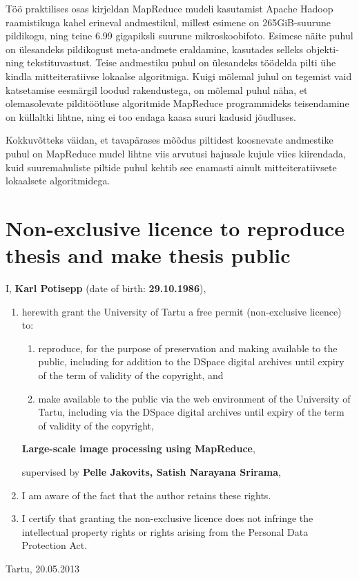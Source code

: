 \documentclass [12pt,a4paper]{report}
\begin{document}
Töö praktilises osas kirjeldan MapReduce mudeli kasutamist Apache Hadoop raamistikuga kahel erineval andmestikul, millest esimene on 265GiB-suurune pildikogu, ning teine 6.99 gigapiksli suurune mikroskoobifoto. Esimese näite puhul on ülesandeks pildikogust meta-andmete eraldamine, kasutades selleks objekti- ning tekstituvastust. Teise andmestiku puhul on ülesandeks töödelda pilti ühe kindla mitteiteratiivse lokaalse algoritmiga. Kuigi mõlemal juhul on tegemist vaid katsetamise eesmärgil loodud rakendustega, on mõlemal puhul näha, et olemasolevate pilditöötluse algoritmide MapReduce programmideks teisendamine on küllaltki lihtne, ning ei too endaga kaasa suuri kadusid jõudluses.

Kokkuvõtteks väidan, et tavapärases mõõdus piltidest koosnevate andmestike puhul on MapReduce mudel lihtne viis arvutusi hajusale kujule viies kiirendada, kuid suuremahuliste piltide puhul kehtib see enamasti ainult mitteiteratiivsete lokaalsete algoritmidega.


\clearpage
{}



\chapter*{Non-exclusive licence to reproduce thesis and make thesis public}

I, \textbf{Karl Potisepp} (date of birth: \textbf{29.10.1986}),

\begin{enumerate}
\item herewith grant the University of Tartu a free permit (non-exclusive licence) to:

\begin{enumerate}
\item reproduce, for the purpose of preservation and making available to the public, including for addition to the DSpace digital archives until expiry of the term of validity of the copyright, and

\item make available to the public via the web environment of the University of Tartu, including via the DSpace digital archives until expiry of the term of validity of the copyright,
\end{enumerate}

\begin{center}
\textbf{Large-scale image processing using MapReduce},
\end{center}

supervised by \textbf{Pelle Jakovits, Satish Narayana Srirama},

\item I am aware of the fact that the author retains these rights.

\item I certify that granting the non-exclusive licence does not infringe the intellectual property rights or rights arising from the Personal Data Protection Act. 
\end{enumerate}



Tartu, 20.05.2013
\end{document}
